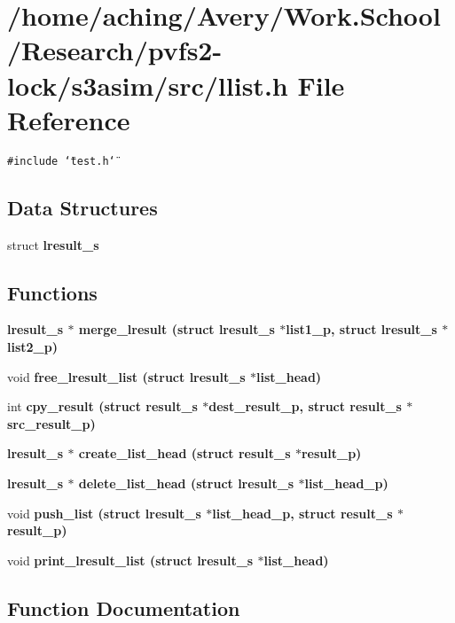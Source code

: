 \section{/home/aching/Avery/Work.School/Research/pvfs2-lock/s3asim/src/llist.h File Reference}
\label{llist_8h}
{\tt \#include \char`\"{}test.h\char`\"{}}\par
\subsection*{Data Structures}
\begin{CompactItemize}
\item 
struct \bf{lresult\_\-s}
\end{CompactItemize}
\subsection*{Functions}
\begin{CompactItemize}
\item 
\bf{lresult\_\-s} $\ast$ \bf{merge\_\-lresult} (struct \bf{lresult\_\-s} $\ast$list1\_\-p, struct \bf{lresult\_\-s} $\ast$list2\_\-p)
\item 
void \bf{free\_\-lresult\_\-list} (struct \bf{lresult\_\-s} $\ast$list\_\-head)
\item 
int \bf{cpy\_\-result} (struct \bf{result\_\-s} $\ast$dest\_\-result\_\-p, struct \bf{result\_\-s} $\ast$src\_\-result\_\-p)
\item 
\bf{lresult\_\-s} $\ast$ \bf{create\_\-list\_\-head} (struct \bf{result\_\-s} $\ast$result\_\-p)
\item 
\bf{lresult\_\-s} $\ast$ \bf{delete\_\-list\_\-head} (struct \bf{lresult\_\-s} $\ast$list\_\-head\_\-p)
\item 
void \bf{push\_\-list} (struct \bf{lresult\_\-s} $\ast$list\_\-head\_\-p, struct \bf{result\_\-s} $\ast$result\_\-p)
\item 
void \bf{print\_\-lresult\_\-list} (struct \bf{lresult\_\-s} $\ast$list\_\-head)
\end{CompactItemize}


\subsection{Function Documentation}
